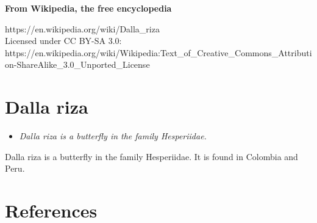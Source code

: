 \textbf{From Wikipedia, the free encyclopedia}

https://en.wikipedia.org/wiki/Dalla\_riza\\
Licensed under CC BY-SA 3.0:\\
https://en.wikipedia.org/wiki/Wikipedia:Text\_of\_Creative\_Commons\_Attribution-ShareAlike\_3.0\_Unported\_License

\section{Dalla riza}\label{dalla-riza}

\begin{itemize}
\item
  \emph{Dalla riza is a butterfly in the family Hesperiidae.}
\end{itemize}

Dalla riza is a butterfly in the family Hesperiidae. It is found in
Colombia and Peru.

\section{References}\label{references}
